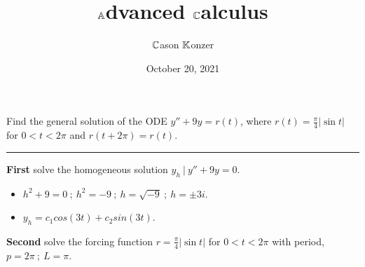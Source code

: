 \documentclass[10pt]{article}
\title{$\mathbb{A}$dvanced $\mathbb{C}$alculus}
\author{$\mathbb{C}$ason $\mathbb{K}$onzer}
\date{October 20, 2021}
\begin{document}
\maketitle

\newpage

\section{\underline{}}
\label{sec: Problem 1}
\noindent
Find the general solution of the ODE $ y'' + 9y = r(t) $, where $ \displaystyle r(t) = \frac{\pi}{4} |\sin{t}| $ for $ 0 < t < 2\pi $ and $ r(t + 2\pi) = r(t) $. \\
\vspace{2.5mm}
\hrule

\vspace{7.5mm}

\noindent
\textbf{First} solve the homogeneous solution $ y_h \ | \ y'' + 9y = 0 $. \\

\begin{itemize}
    \item $ \displaystyle h^2 + 9 = 0 \ ; \ h^2 = -9 \ ; \ h = \sqrt{-9} \ ; \ h = \pm 3i $. \\
    \item $ \displaystyle y_h = c_1 cos(3t) + c_2 sin(3t) $. \\
\end{itemize}

\noindent
\textbf{Second} solve the forcing function $ \displaystyle r = \frac{\pi}{4} |\sin{t}| $ for $ 0 < t < 2\pi $ with period, $ p = 2\pi \ ; \ L = \pi $. \\
\end{document}
